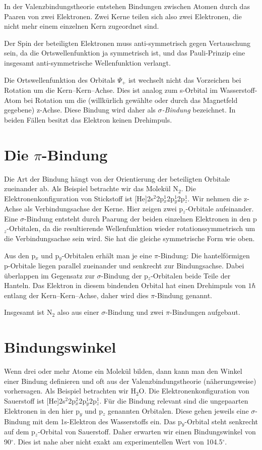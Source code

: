 In der Valenzbindungstheorie entstehen Bindungen zwischen Atomen durch das 
Paaren von zwei Elektronen. Zwei Kerne teilen sich also zwei Elektronen, die nicht mehr einem einzelnen Kern zugeordnet sind.

Der Spin der beteiligten Elektronen muss anti-symmetrisch gegen Vertauschung sein, da die Ortswellenfunktion ja symmetrisch ist, und das Pauli-Prinzip eine insgesamt anti-symmetrische Wellenfunktion  verlangt.

Die Ortswellenfunktion des Orbitals $\Psi_{+}$ ist wechselt nicht das Vorzeichen bei Rotation um die Kern--Kern--Achse. Dies ist analog zum s-Orbital im Wasserstoff-Atom bei Rotation um die (willkürlich gewählte oder durch das Magnetfeld gegebene) z-Achse.  Diese Bindung wird daher als \emph{$\sigma$-Bindung} bezeichnet. In beiden Fällen besitzt das Elektron keinen Drehimpuls.




\section{Die $\pi$-Bindung}

Die Art der Bindung hängt von der Orientierung der beteiligten Orbitale zueinander ab. Als Beispiel betrachte wir das Molekül N$_2$. Die Elektronenkonfiguration von Stickstoff ist [He]2s$^2$2p$_x^1$2p$_y^1$2p$_z^1$. Wir nehmen die z-Achse als Verbindungsachse der Kerne. Hier zeigen zwei p$_z$-Orbitale aufeinander. Eine $\sigma$-Bindung entsteht durch Paarung der beiden einzelnen Elektronen in den  p$_z$-Orbitalen, da die resultierende Wellenfunktion wieder rotationssymmetrisch um die Verbindungsachse sein wird. Sie hat die gleiche symmetrische Form wie oben.

Aus den p$_x$ und p$_y$-Orbitalen erhält man je eine $\pi$-Bindung: Die hantelförmigen p-Orbitale liegen parallel zueinander und senkrecht zur Bindungsachse. Dabei überlappen im Gegensatz zur $\sigma$-Bindung der p$_z$-Orbitalen beide Teile der Hanteln. Das Elektron in diesem bindenden Orbital hat einen Drehimpuls von $1 \hbar$ entlang der Kern--Kern--Achse, daher wird dies $\pi$-Bindung genannt.


Insgesamt ist N$_2$ also aus einer $\sigma$-Bindung und zwei $\pi$-Bindungen
aufgebaut.


\section{Bindungswinkel}

Wenn drei oder mehr Atome ein Molekül bilden, dann kann man den Winkel einer Bindung definieren und oft aus der Valenzbindungstheorie (näherungsweise) vorhersagen. Als Beispiel betrachten wir H$_2$O. Die Elektronenkonfiguration von Sauerstoff ist [He]2s$^2$2p$_x^2$2p$_y^1$2p$_z^1$. Für die Bindung relevant sind die ungepaarten Elektronen in den hier p$_y$ und p$_z$ genannten Orbitalen. Diese gehen jeweils eine $\sigma$-Bindung mit dem 1s-Elektron des Wasserstoffs ein. Das p$_y$-Orbital steht senkrecht auf dem  p$_z$-Orbital von Sauerstoff. Daher erwarten wir einen Bindungswinkel von 90$^\circ$. Dies ist nahe aber nicht exakt am experimentellen Wert von 104.5$^\circ$.


